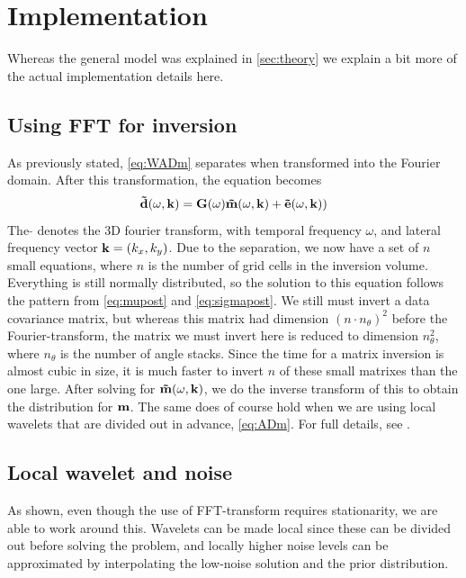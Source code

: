 \chapter{Implementation}
\label{sec:implementation}

Whereas the general model was explained in \autoref{sec:theory} we explain a bit more of the actual implementation details here.

\section{Using FFT for inversion}
As previously stated, \autoref{eq:WADm} separates when transformed into the Fourier domain. After this transformation, the equation becomes
\begin{equation}
\label{eq:fourierinv}
\mathbf{\tilde{d}}(\omega,\mathbf{k}) = \mathbf{G}(\omega)\mathbf{\tilde{m}}(\omega,\mathbf{k}) + \mathbf{\tilde{e}}(\omega,\mathbf{k}))
\end{equation}
The $\tilde{ }$ denotes the 3D fourier transform, with temporal frequency $\omega$, and lateral frequency vector $\mathbf{k} = (k_x,k_y)$. Due to the separation, we now have a set of $n$ small equations, where $n$ is the number of grid cells in the inversion volume. Everything is still normally distributed, so the solution to this equation follows the pattern from \autoref{eq:mupost} and \autoref{eq:sigmapost}. We still must invert a data covariance matrix, but whereas this matrix had dimension $(n\cdot n_\theta)^2$ before the Fourier-transform, the matrix we must invert here is reduced to dimension $n_\theta^2$, where $n_\theta$ is the number of angle stacks. Since the time for a matrix inversion is almost cubic in size, it is much faster to invert $n$ of these small matrixes than the one large. After solving for $\mathbf{\tilde{m}}(\omega,\mathbf{k})$, we do the inverse transform of this to obtain the distribution for $\mathbf{m}$. The same does of course hold when we are using local wavelets that are divided out in advance, \autoref{eq:ADm}. For full details, see \cite{geo68ab2}.

\section{Local wavelet and noise}
\label{sec:nonstationaryimp}
As shown, even though the use of FFT-transform requires stationarity, we are able to work around this. Wavelets can be made local since these can be divided out before solving the problem, and locally higher noise levels can be approximated by interpolating the low-noise solution and the prior distribution.

